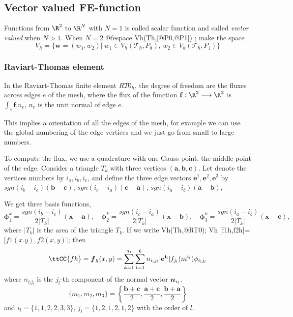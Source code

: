 \documentclass[a4paper,twoside,12pt]{book}
\def\vec#1{\mbox{\boldmath $#1$}}
\begin{document}
\subsection{Vector valued FE-function}
Functions from  $\R^{2}$ to $\R^{N}$ with $N=1$ is called scalar function and
called \emph{vector valued} when $N>1$.
When $N=2$
\bFF
     @fespace Vh(Th,[@P0,@P1]) ;
\eFF
make the space
\[
V_h=\{\mathbf{w}=(w_1,w_2)|\; w_1\in V_h(\mathcal{T}_h,P_0),\,
w_2\in V_h(\mathcal{T}_h,P_1)\}
\]

\subsubsection{Raviart-Thomas element}
In the Raviart-Thomas finite element $RT0_{h}$,
the degree of freedom are the fluxes  across edges $e$ of the mesh, where the flux of the function $\mathbf{f} : \R^2 \longrightarrow \R^2 $ is $\int_{e} \mathbf{f}.n_{e}$,
 $n_{e}$ is the unit normal of edge $e$.

 This implies a orientation of all the edges of the mesh,
 for example we can use the global numbering of the edge vertices and we just go from small to large numbers.

To compute the flux, we use a quadrature  with one Gauss point, the middle point of the edge.
Consider a triangle $T_k$ with three vertices $(\mathbf{a},\mathbf{b},\mathbf{c})$.
Let denote the  vertices numbers by $i_{a},i_{b},i_{c}$, and define the three edge
vectors $\mathbf{e}^{1},\mathbf{e}^{2},\mathbf{e}^{3}$
by $ sgn(i_{b}-i_{c})(\mathbf{b}-\mathbf{c})$, $sgn(i_{c}-i_{a})(\mathbf{c}-\mathbf{a})$,
$sgn(i_{a}-i_{b})(\mathbf{a}-\mathbf{b})$,

We get three basis functions,
\begin{equation}
\boldsymbol{\phi}^{k}_{1}= \frac{sgn(i_{b}-i_{c})}{2|T_k|}(\mathbf{x}-\mathbf{a}),\quad
\boldsymbol{\phi}^{k}_{2}= \frac{sgn(i_{c}-i_{a})}{2|T_k|}(\mathbf{x}-\mathbf{b}),\quad
\boldsymbol{\phi}^{k}_{3}= \frac{sgn(i_{a}-i_{b})}{2|T_k|}(\mathbf{x}-\mathbf{c}),
\end{equation}
where $|T_k|$ is the area of the triangle $T_k$.
If we write
\bFF
Vh(Th,@RT0); Vh [f1h,f2h]=[$f1(x.y),f2(x,y)$];
\eFF
then
$$
\ttCC{fh}=\vec{f}_h(x,y)=\sum_{k=1}^{n_t}\sum_{l=1}^6
n_{i_lj_l}|\mathbf{e^{i_l}}|f_{j_l}(m^{i_l})
\phi_{i_lj_l}
$$
where $n_{i_lj_l}$ is the $j_l$-th component of the normal vector
$\vec{n}_{i_l}$,
$$
\{m_1,m_2,m_3\} = \left\{\frac{\mathbf{b}+\mathbf{c}}{2},
\frac{\mathbf{a}+\mathbf{c}}{2},
\frac{\mathbf{b}+\mathbf{a}}{2} \right\}
$$
and
$i_l=\{1,1,2,2,3,3\},\, j_l=\{1,2,1,2,1,2\}$ with the order
of $l$.
\end{document}
